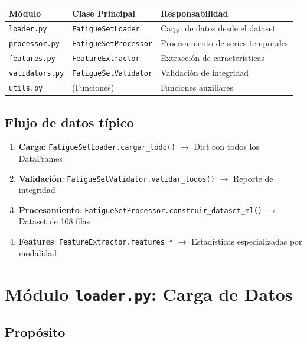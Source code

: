 \documentclass[12pt,a4paper]{article}
\begin{document}
\begin{center}
\begin{tabular}{|l|l|p{6cm}|}
\toprule
\textbf{Módulo} & \textbf{Clase Principal} & \textbf{Responsabilidad} \\
\midrule
\texttt{loader.py} & \texttt{FatigueSetLoader} & Carga de datos desde el dataset \\
\texttt{processor.py} & \texttt{FatigueSetProcessor} & Procesamiento de series temporales \\
\texttt{features.py} & \texttt{FeatureExtractor} & Extracción de características \\
\texttt{validators.py} & \texttt{FatigueSetValidator} & Validación de integridad \\
\texttt{utils.py} & (Funciones) & Funciones auxiliares \\
\bottomrule
\end{tabular}
\end{center}

\subsection{Flujo de datos típico}

\begin{enumerate}
    \item \textbf{Carga}: \texttt{FatigueSetLoader.cargar\_todo()} $\rightarrow$ Dict con todos los DataFrames
    \item \textbf{Validación}: \texttt{FatigueSetValidator.validar\_todos()} $\rightarrow$ Reporte de integridad
    \item \textbf{Procesamiento}: \texttt{FatigueSetProcessor.construir\_dataset\_ml()} $\rightarrow$ Dataset de 108 filas
    \item \textbf{Features}: \texttt{FeatureExtractor.features\_*} $\rightarrow$ Estadísticas especializadas por modalidad
\end{enumerate}

\section{Módulo \texttt{loader.py}: Carga de Datos}

\subsection{Propósito}
\end{document}
